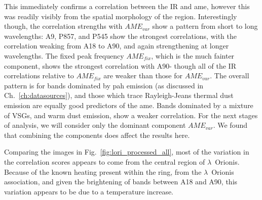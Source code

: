      This immediately confirms a correlation between the IR and \gls{ame}, however this was readily visibly from the spatial morphology of the region. Interestingly though, the correlation strengths with $AME_{var}$ show a pattern from short to long wavelengths: A9, P857, and P545 show the strongest correlations, with the correlation weaking from A18 to A90, and again strengthening at longer wavelengths. The fixed peak frequency $AME_{fix}$, which is the much fainter component, shows the strongest correlation with A90- though all of the IR correlations relative to $AME_{fix}$ are weaker than those for $AME_{var}$. The overall pattern is for bands dominated by \gls{pah} emission (as discussed in Ch.~\ref{ch:datasources}), and those which trace Rayleigh-Jeans thermal dust emission are equally good predictors of the \gls{ame}. Bands dominated by a mixture of VSGs, and warm dust emission, show a weaker correlation. For the next stages of analysis, we will consider only the dominant component $AME_{var}$. We found that combining the components does affect the results here.

     Comparing the images in Fig.~\ref{fig:lori_processed_all}, most of the variation in the correlation scores appears to come from the central region of $\lambda$~Orionis. Because of the known heating present within the ring, from the $\lambda$~Orionis association, and given the brightening of bands between A18 and A90, this variation appears to be due to a temperature increase.
